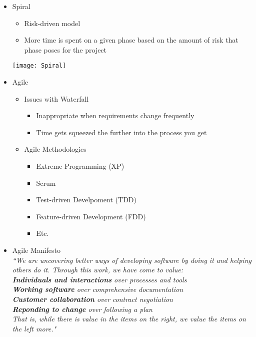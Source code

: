 \begin{itemize}
	\item Spiral\\
	\begin{minipage}{0.7\textwidth}
		\begin{itemize}
			\item Risk-driven model
			\item More time is spent on a given phase based on the amount of risk that phase poses for the project
		\end{itemize}
	\end{minipage}
	\begin{minipage}{0.3\textwidth}
		\texttt{[image: Spiral]}
	\end{minipage}

	\item Agile
	\begin{itemize}
		\item Issues with Waterfall
		\begin{itemize}
			\item Inappropriate when requirements change frequently
			\item Time gets squeezed the further into the process you get
		\end{itemize}
		\item Agile Methodologies
		\begin{itemize}
			\item Extreme Programming (XP)
			\item Scrum
			\item Test-driven Develpoment (TDD)
			\item Feature-driven Development (FDD)
			\item Etc.
		\end{itemize}
	\end{itemize}

	\item Agile Manifesto\\
	\emph{``We are uncovering better ways of developing software by doing it and helping others do it. Through this work, we have come to value:\\
		\hspace*{10mm} \textbf{Individuals and interactions} over processes and tools\\
		\hspace*{10mm} \textbf{Working software} over comprehensive documentation\\
		\hspace*{10mm} \textbf{Customer collaboration} over contract negotiation\\
		\hspace*{10mm} \textbf{Reponding to change} over following a plan\\
		That is, while there is value in the items on the right, we value the items on the left more."}


\end{itemize}
